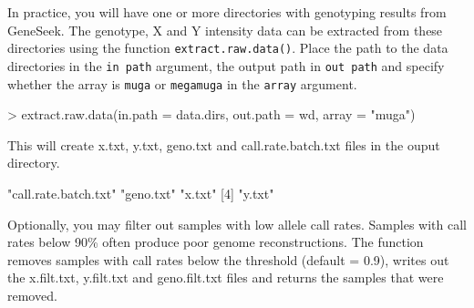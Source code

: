 \documentclass{article}
\begin{document}
In practice, you will have one or more directories with genotyping results from GeneSeek. The genotype, X and Y intensity data can be extracted from these directories using the function \texttt{extract.raw.data()}. Place the path to the data directories in the \texttt{in path} argument, the output path in \texttt{out path} and specify whether the array is \texttt{muga} or \texttt{megamuga} in the \texttt{array} argument.

\begin{Schunk}
\begin{Sinput}
> extract.raw.data(in.path = data.dirs, out.path = wd, array = "muga")
\end{Sinput}
\end{Schunk}

This will create x.txt, y.txt, geno.txt and call.rate.batch.txt files in the ouput directory.

\begin{Schunk}
\begin{Soutput}
[1] "call.rate.batch.txt" "geno.txt"            "x.txt"              
[4] "y.txt"              
\end{Soutput}
\end{Schunk}

Optionally, you may filter out samples with low allele call rates. Samples with call rates below 90\% 
often produce poor genome reconstructions. The function removes samples with call rates below the
threshold (default = 0.9), writes out the x.filt.txt, y.filt.txt and geno.filt.txt files and returns
the samples that were removed.
\end{document}
